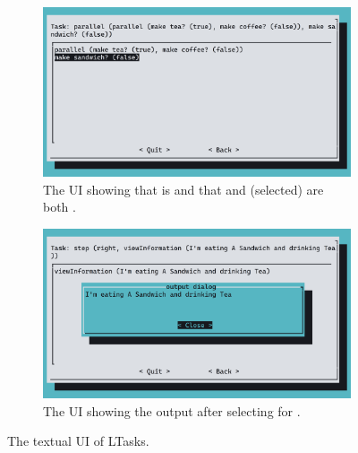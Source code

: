 \begin{figure}
\centering
\begin{subfigure}{0.8\textwidth}
    \centering
    \includegraphics[width=\textwidth]{img/screenshot-ltasks-breakfast.png}
    \caption{The UI showing that  is  and that  and  (selected) are both .}
    \label{fig:comparison_ltask_ui_1}
\end{subfigure}
\begin{subfigure}{0.8\textwidth}
    \centering
    \bigskip
    \includegraphics[width=\textwidth]{img/screenshot-ltasks-breakfast-view.png}
    \caption{The UI showing the output after selecting  for .}
    \label{fig:comparison_ltask_ui_2}
\end{subfigure}
\caption{The textual UI of LTasks.}
\label{fig:comparison_ltask_ui}
\end{figure}

